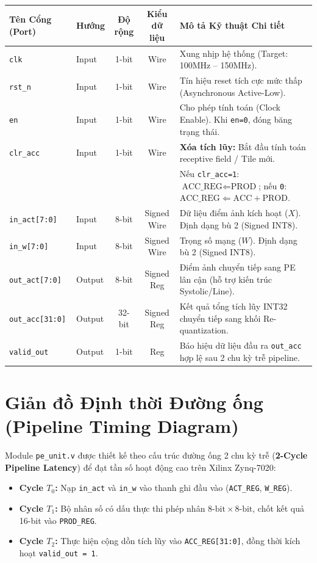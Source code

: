 \documentclass[11pt,a4paper]{article}
\begin{document}
\begin{table}[h!]
\centering
\small
\renewcommand{\arraystretch}{1.2}
\begin{tabular}{@{}llccl@{}}
\toprule
\textbf{Tên Cổng (Port)} & \textbf{Hướng} & \textbf{Độ rộng} & \textbf{Kiểu dữ liệu} & \textbf{Mô tả Kỹ thuật Chi tiết} \\ \midrule
\texttt{clk}            & Input  & 1-bit  & Wire & Xung nhịp hệ thống (Target: 100MHz -- 150MHz). \\
\texttt{rst\_n}          & Input  & 1-bit  & Wire & Tín hiệu reset tích cực mức thấp (Asynchronous Active-Low). \\
\texttt{en}             & Input  & 1-bit  & Wire & Cho phép tính toán (Clock Enable). Khi \texttt{en=0}, đóng băng trạng thái. \\
\texttt{clr\_acc}        & Input  & 1-bit  & Wire & \textbf{Xóa tích lũy:} Bắt đầu tính toán receptive field / Tile mới. \\
                        &        &        &      & Nếu \texttt{clr\_acc=1}: $\text{ACC\_REG} \Leftarrow \text{PROD}$; nếu \texttt{0}: $\text{ACC\_REG} \Leftarrow \text{ACC} + \text{PROD}$. \\
\texttt{in\_act[7:0]}   & Input  & 8-bit  & Signed Wire & Dữ liệu điểm ảnh kích hoạt ($X$). Định dạng bù 2 (Signed INT8). \\
\texttt{in\_w[7:0]}     & Input  & 8-bit  & Signed Wire & Trọng số mạng ($W$). Định dạng bù 2 (Signed INT8). \\ \midrule
\texttt{out\_act[7:0]}  & Output & 8-bit  & Signed Reg  & Điểm ảnh chuyển tiếp sang PE lân cận (hỗ trợ kiến trúc Systolic/Line). \\
\texttt{out\_acc[31:0]} & Output & 32-bit & Signed Reg  & Kết quả tổng tích lũy INT32 chuyển tiếp sang khối Re-quantization. \\
\texttt{valid\_out}     & Output & 1-bit  & Reg  & Báo hiệu dữ liệu đầu ra \texttt{out\_acc} hợp lệ sau 2 chu kỳ trễ pipeline. \\ \bottomrule
\end{tabular}
\end{table}

\newpage
\section{Giản đồ Định thời Đường ống (Pipeline Timing Diagram)}

Module \texttt{pe\_unit.v} được thiết kế theo cấu trúc đường ống 2 chu kỳ trễ (\textbf{2-Cycle Pipeline Latency}) để đạt tần số hoạt động cao trên Xilinx Zynq-7020:
\begin{itemize}
    \item \textbf{Cycle $T_0$:} Nạp \texttt{in\_act} và \texttt{in\_w} vào thanh ghi đầu vào (\texttt{ACT\_REG}, \texttt{W\_REG}).
    \item \textbf{Cycle $T_1$:} Bộ nhân số có dấu thực thi phép nhân $8\text{-bit} \times 8\text{-bit}$, chốt kết quả 16-bit vào \texttt{PROD\_REG}.
    \item \textbf{Cycle $T_2$:} Thực hiện cộng dồn tích lũy vào \texttt{ACC\_REG[31:0]}, đồng thời kích hoạt \texttt{valid\_out = 1}.
\end{itemize}
\end{document}

